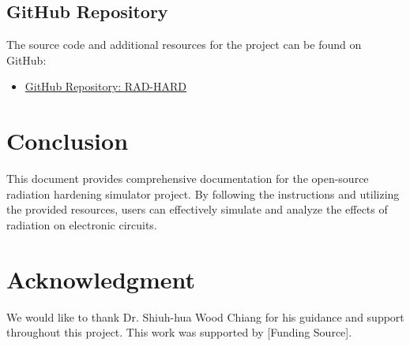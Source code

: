 \documentclass[12pt]{article}
\begin{document}
\subsection{GitHub Repository}
The source code and additional resources for the project can be found on GitHub:
\begin{itemize}
    \item \href{https://github.com/Jacoba1100254352/RAD-HARD}{GitHub Repository: RAD-HARD}
\end{itemize}

\section{Conclusion}
This document provides comprehensive documentation for the open-source radiation hardening simulator project. By following the instructions and utilizing the provided resources, users can effectively simulate and analyze the effects of radiation on electronic circuits.

\section*{Acknowledgment}
We would like to thank Dr. Shiuh-hua Wood Chiang for his guidance and support throughout this project. This work was supported by [Funding Source].
\end{document}
